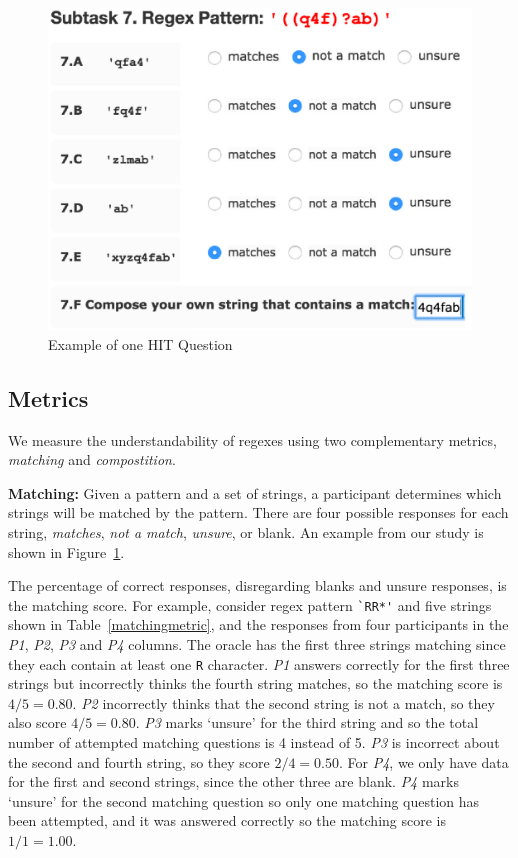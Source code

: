 \begin{figure}[tb]
\centering
\includegraphics[width=0.8\columnwidth]{nontex/illustrations/exampleQuestion.eps}
\vspace{-12pt}
\caption{Example of one HIT Question}
\vspace{-6pt}
\label{fig:exampleQuestion}
\end{figure}



\subsection{Metrics}
\label{sec:understadningmetric}
We measure the understandability of regexes using two complementary metrics, \emph{matching} and \emph{compostition}.

\textbf{Matching:}
Given a pattern and a set of strings, a participant determines which strings will be matched by the pattern. There are four possible responses for each string, \emph{matches}, \emph{not a match}, \emph{unsure}, or blank. An example from our study is shown in Figure~\ref{fig:exampleQuestion}.

The percentage of correct responses, disregarding blanks and unsure responses, is the matching score.
For example, consider regex pattern \verb!`RR*'! and five strings shown in Table~\ref{matchingmetric}, and the responses from four participants in the \emph{P1}, \emph{P2}, \emph{P3} and \emph{P4} columns.
The oracle has the first three strings matching since they each contain at least one \verb!R! character. \emph{P1} answers correctly for the first three strings but incorrectly thinks the fourth string matches, so the matching score is $4/5 = 0.80$. \emph{P2} incorrectly thinks that the second string is not a match, so they also score $4/5 = 0.80$.  \emph{P3} marks `unsure' for the third string and so the total number of attempted matching questions is 4 instead of 5. \emph{P3} is incorrect about the second and fourth string, so they score $2/4 = 0.50$.  For \emph{P4}, we only have data for the first and second strings, since the other three are blank.  \emph{P4} marks `unsure' for the second matching question so only one matching question has been attempted, and it was answered correctly so the matching score is $1/1 = 1.00$.

